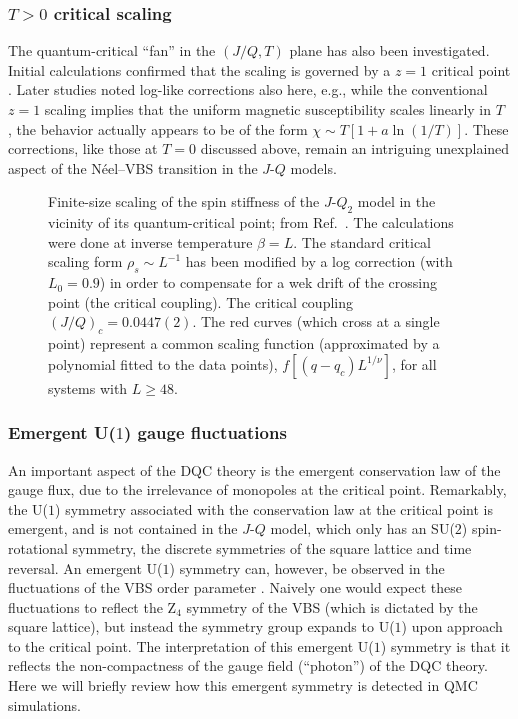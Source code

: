 \documentclass[range]{ar2e}
\begin{document}
\subsubsection{$T>0$ critical scaling} The quantum-critical ``fan'' in the $(J/Q,T)$ plane has also been investigated. Initial calculations confirmed that
the scaling is governed by a $z=1$ critical point \cite{melko2008:jq}. Later studies \cite{Sandvik10c,Sandvik11a} noted log-like corrections also here, e.g., 
while the conventional $z=1$ scaling implies that the uniform magnetic susceptibility scales linearly in $T$ \cite{Chakravarty89}, the behavior actually appears 
to be of the form $\chi \sim T[1+a\ln(1/T)]$. These corrections, like those at $T=0$ discussed above, remain an intriguing unexplained aspect of the N\'eel--VBS 
transition in the $J$-$Q$ models.

\begin{figure}
\centerline{}
\caption{Finite-size scaling of the spin stiffness of the $J$-$Q_2$ model in the vicinity of its quantum-critical point; from Ref.~\cite{Sandvik10c}. The 
calculations were done at inverse temperature $\beta=L$. The standard critical scaling form $\rho_s \sim L^{-1}$ has been modified by a log correction 
(with $L_0=0.9$) in order to compensate for a wek drift of the crossing point (the critical coupling). The critical coupling $(J/Q)_c = 0.0447(2)$. The
red curves (which cross at a single point) represent a common scaling function (approximated by a polynomial fitted to the data points), $f[(q-q_c)L^{1/\nu}]$,
for all systems with $L\ge 48$.}
\label{jqrhos}
\end{figure}

\subsubsection{Emergent U($1$) gauge fluctuations}

An important aspect of the DQC theory is the emergent conservation law of the gauge flux, due to the irrelevance of monopoles at the critical point. 
Remarkably, the  U($1$) symmetry associated with the conservation law at the critical point is emergent, and is not contained in the $J$-$Q$ model, which
only has an SU($2$) spin-rotational symmetry, the discrete symmetries of the square lattice and time reversal. An emergent U($1$) symmetry 
can, however, be observed in the fluctuations of the VBS order parameter \cite{Sandvik07}. Naively one would expect these fluctuations 
to reflect the Z$_4$ symmetry of the VBS (which is dictated by the square lattice), but instead the symmetry group expands to U($1$) 
upon approach to the critical point. The interpretation of this emergent U($1$) symmetry is that it reflects the non-compactness of the gauge field (``photon'') 
of the DQC theory. Here we will briefly review how this emergent symmetry is detected in QMC simulations.
\end{document}
